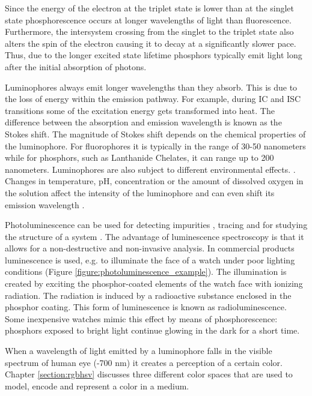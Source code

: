 \documentclass[thesis.tex]{subfiles}
\begin{document}
\noindent Since the energy of the electron at the triplet state is lower than at the singlet state phosphorescence occurs at longer wavelengths of light than fluorescence. Furthermore, the intersystem crossing from the singlet to the triplet state also alters the spin of the electron causing it to decay at a significantly slower pace. Thus, due to the longer excited state lifetime phosphors typically emit light long after the initial absorption of photons. \cite{CEJ}

Luminophores always emit longer wavelengths than they absorb. This is due to the loss of energy within the emission pathway. For example, during IC and ISC transitions some of the excitation energy gets transformed into heat. The difference between the absorption and emission wavelength is known as the Stokes shift. The magnitude of Stokes shift depends on the chemical properties of the luminophore. For fluorophores it is typically in the range of 30-50 nanometers while for phosphors, such as Lanthanide Chelates, it can range up to 200 nanometers. Luminophores are also subject to different environmental effects. \cite{hemmila}. Changes in temperature, pH, concentration or the amount of dissolved oxygen in the solution affect the intensity of the luminophore and can even shift its emission wavelength \cite{luminescence_basics}.

Photoluminescence can be used for detecting impurities \cite{photoluminescence_use_case_1}, tracing \cite{photoluminescence_use_case_2} and for studying the structure of a system \cite{photoluminescence_use_case_3}. The advantage of luminescence spectroscopy is that it allows for a non-destructive and non-invasive analysis. In commercial products luminescence is used, e.g. to illuminate the face of a watch under poor lighting conditions (Figure \ref{figure:photoluminescence_example}). The illumination is created by exciting the phosphor-coated elements of the watch face with ionizing radiation. The radiation is induced by a radioactive substance enclosed in the phosphor coating. This form of luminescence is known as radioluminescence. Some inexpensive watches mimic this effect by means of phosphorescence: phosphors exposed to bright light continue glowing in the dark for a short time.

When a wavelength of light emitted by a luminophore falls in the visible spectrum of human eye (-700 nm) it creates a perception of a certain color. Chapter \ref{section:rgbhsv} discusses three different color spaces that are used to model, encode and represent a color in a medium.
\end{document}
